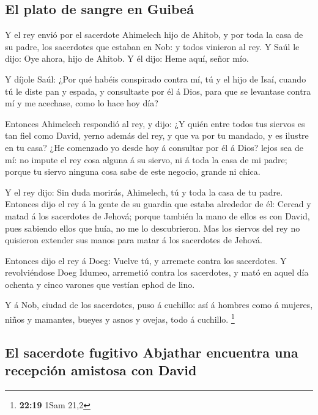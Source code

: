\hypertarget{el-plato-de-sangre-en-guibeuxe1}{%
\subsection{El plato de sangre en
Guibeá}\label{el-plato-de-sangre-en-guibeuxe1}}

 Y el rey envió por el sacerdote Ahimelech hijo de
Ahitob, y por toda la casa de su padre, los sacerdotes que estaban en
Nob: y todos vinieron al rey.  Y Saúl le dijo: Oye ahora,
hijo de Ahitob. Y él dijo: Heme aquí, señor mío.

 Y díjole Saúl: ¿Por qué habéis conspirado contra mí, tú
y el hijo de Isaí, cuando tú le diste pan y espada, y consultaste por él
á Dios, para que se levantase contra mí y me acechase, como lo hace hoy
día?

 Entonces Ahimelech respondió al rey, y dijo: ¿Y quién
entre todos tus siervos es tan fiel como David, yerno además del rey, y
que va por tu mandado, y es ilustre en tu casa?  ¿He
comenzado yo desde hoy á consultar por él á Dios? lejos sea de mí: no
impute el rey cosa alguna á su siervo, ni á toda la casa de mi padre;
porque tu siervo ninguna cosa sabe de este negocio, grande ni chica.

 Y el rey dijo: Sin duda morirás, Ahimelech, tú y toda la
casa de tu padre.  Entonces dijo el rey á la gente de su
guardia que estaba alrededor de él: Cercad y matad á los sacerdotes de
Jehová; porque también la mano de ellos es con David, pues sabiendo
ellos que huía, no me lo descubrieron. Mas los siervos del rey no
quisieron extender sus manos para matar á los sacerdotes de Jehová.

 Entonces dijo el rey á Doeg: Vuelve tú, y arremete
contra los sacerdotes. Y revolviéndose Doeg Idumeo, arremetió contra los
sacerdotes, y mató en aquel día ochenta y cinco varones que vestían
ephod de lino.

 Y á Nob, ciudad de los sacerdotes, puso á cuchillo: así
á hombres como á mujeres, niños y mamantes, bueyes y asnos y ovejas,
todo á cuchillo. \footnote{\textbf{22:19} 1Sam 21,2}

\hypertarget{el-sacerdote-fugitivo-abjathar-encuentra-una-recepciuxf3n-amistosa-con-david}{%
\subsection{El sacerdote fugitivo Abjathar encuentra una recepción
amistosa con
David}\label{el-sacerdote-fugitivo-abjathar-encuentra-una-recepciuxf3n-amistosa-con-david}}

